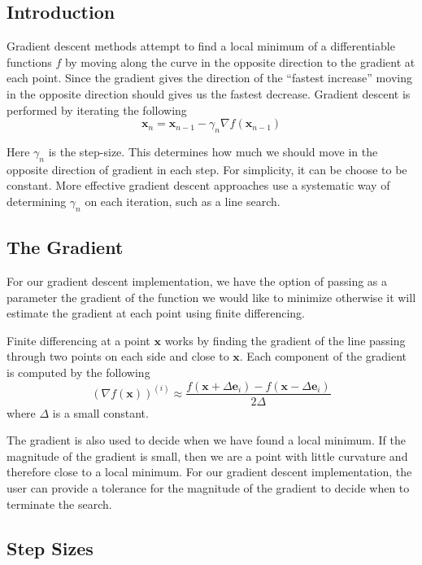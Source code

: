 \documentclass[12pt,]{article}
\begin{document}
\hypertarget{introduction}{%
\subsection{Introduction}\label{introduction}}

Gradient descent methods attempt to find a local minimum of a
differentiable functions \(f\) by moving along the curve in the opposite
direction to the gradient at each point. Since the gradient gives the
direction of the ``fastest increase'' moving in the opposite direction
should gives us the fastest decrease. Gradient descent is performed by
iterating the following \[
    \mathbf{x}_n = \mathbf{x}_{n-1} - \gamma_n \nabla f(\mathbf{x}_{n-1})
\]

Here \(\gamma_n\) is the step-size. This determines how much we should
move in the opposite direction of gradient in each step. For simplicity,
it can be choose to be constant. More effective gradient descent
approaches use a systematic way of determining \(\gamma_n\) on each
iteration, such as a line search.

\hypertarget{the-gradient}{%
\subsection{The Gradient}\label{the-gradient}}

For our gradient descent implementation, we have the option of passing
as a parameter the gradient of the function we would like to minimize
otherwise it will estimate the gradient at each point using finite
differencing.

Finite differencing at a point \(\mathbf{x}\) works by finding the
gradient of the line passing through two points on each side and close
to \(\mathbf{x}\). Each component of the gradient is computed by the
following \[
(\nabla f (\mathbf{x}))^{(i)} \approx \frac{f(\mathbf{x} + \Delta \mathbf{e}_i) - f(\mathbf{x} - \Delta \mathbf{e}_i)}{2\Delta}
\] where \(\Delta\) is a small constant.

The gradient is also used to decide when we have found a local minimum.
If the magnitude of the gradient is small, then we are a point with
little curvature and therefore close to a local minimum. For our
gradient descent implementation, the user can provide a tolerance for
the magnitude of the gradient to decide when to terminate the search.

\hypertarget{step-sizes}{%
\subsection{Step Sizes}\label{step-sizes}}
\end{document}
